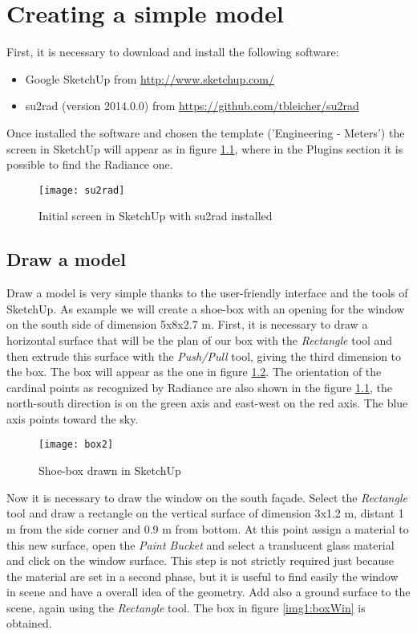\chapter{Creating a simple model}
First, it is necessary to download and install the following software:

\begin{itemize}
\renewcommand{\labelitemi}{\tiny$\blacksquare$}
\item Google SketchUp from \url{http://www.sketchup.com/}
\item su2rad (version 2014.0.0) from \url{https://github.com/tbleicher/su2rad}
\end{itemize}

Once installed the software and chosen the template ('Engineering - Meters')  the screen in SketchUp will appear as in figure \ref{img1:su2rad}, where in the Plugins section it is possible to find the Radiance one.

\begin{figure}[H]
\centering
\texttt{[image: su2rad]}
\caption{\label{img1:su2rad} Initial screen in SketchUp with su2rad installed}
\end{figure}

\section{Draw a model}

Draw a model is very simple thanks to the user-friendly interface and the tools of SketchUp. As example we will create a shoe-box with an opening for the window on the south side of dimension 5x8x2.7 m. First, it is necessary to draw a horizontal surface that will be the plan of our box with the \textit{Rectangle} tool and then extrude this surface with the \textit{Push/Pull} tool, giving the third dimension to the box. The box will appear as the one in figure \ref{img1:box}. The orientation of the cardinal points as recognized by Radiance are also shown in the figure \ref{img1:su2rad}, the north-south direction is on the green axis  and east-west on the red axis. The blue axis points toward the sky.

\begin{figure}[h]
\centering
\texttt{[image: box2]}
\caption{\label{img1:box} Shoe-box drawn in SketchUp}
\end{figure}

Now it is necessary to draw the window on the south fa\c{c}ade. Select the \textit{Rectangle} tool and draw a rectangle on the vertical surface of dimension 3x1.2 m, distant 1 m from the side corner and 0.9 m from bottom. At this point assign a material to this new surface, open the \textit{Paint Bucket} and select a translucent glass material and click on the window surface. This step is not strictly required just because the material are set in a second phase, but it is useful to find easily the window in scene and have a overall idea of the geometry. Add also a ground surface to the scene, again using the \textit{Rectangle} tool. The box in figure \ref{img1:boxWin} is obtained. 

